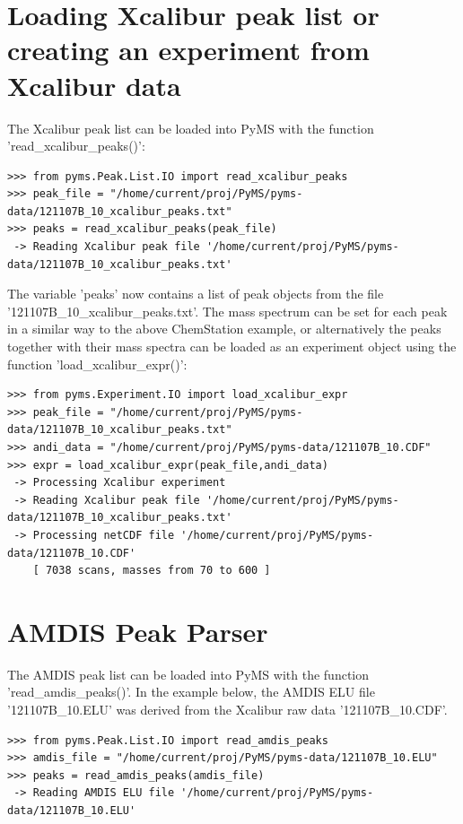 \section{Loading Xcalibur peak list or creating an experiment from Xcalibur data}


The Xcalibur peak list can be loaded into PyMS with the function 'read\_xcalibur\_peaks()':

\begin{verbatim}
>>> from pyms.Peak.List.IO import read_xcalibur_peaks
>>> peak_file = "/home/current/proj/PyMS/pyms-data/121107B_10_xcalibur_peaks.txt"
>>> peaks = read_xcalibur_peaks(peak_file)
 -> Reading Xcalibur peak file '/home/current/proj/PyMS/pyms-data/121107B_10_xcalibur_peaks.txt'
\end{verbatim}

\noindent
The variable 'peaks' now contains a list of peak objects from the file
'121107B\_10\_xcalibur\_peaks.txt'. The mass spectrum can be set for each peak in a
similar way to the above ChemStation example, or alternatively the peaks together
with their mass spectra can be loaded as an experiment object using the function
'load\_xcalibur\_expr()':

\begin{verbatim}
>>> from pyms.Experiment.IO import load_xcalibur_expr
>>> peak_file = "/home/current/proj/PyMS/pyms-data/121107B_10_xcalibur_peaks.txt"
>>> andi_data = "/home/current/proj/PyMS/pyms-data/121107B_10.CDF"
>>> expr = load_xcalibur_expr(peak_file,andi_data)
 -> Processing Xcalibur experiment
 -> Reading Xcalibur peak file '/home/current/proj/PyMS/pyms-data/121107B_10_xcalibur_peaks.txt'
 -> Processing netCDF file '/home/current/proj/PyMS/pyms-data/121107B_10.CDF'
    [ 7038 scans, masses from 70 to 600 ]
\end{verbatim}

\section{AMDIS Peak Parser}


The AMDIS peak list can be loaded into PyMS with the function 'read\_amdis\_peaks()'.
In the example below, the AMDIS ELU file '121107B\_10.ELU' was derived from the
Xcalibur raw data '121107B\_10.CDF'.

\begin{verbatim}
>>> from pyms.Peak.List.IO import read_amdis_peaks
>>> amdis_file = "/home/current/proj/PyMS/pyms-data/121107B_10.ELU"
>>> peaks = read_amdis_peaks(amdis_file)
 -> Reading AMDIS ELU file '/home/current/proj/PyMS/pyms-data/121107B_10.ELU'
\end{verbatim}

